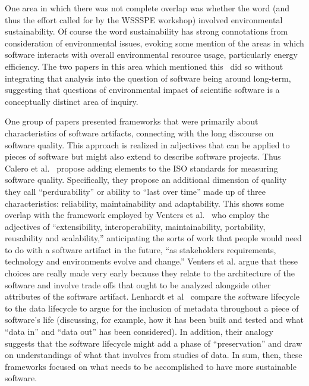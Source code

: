 \documentclass[11pt, oneside]{amsart}
\begin{document}
One area in which there was not complete overlap was whether the word
(and thus the effort called for by the WSSSPE workshop) involved
environmental sustainability. Of course the word sustainability has
strong connotations from consideration of environmental issues,
evoking some mention of the areas in which software interacts with
overall environmental resource usage, particularly energy efficiency.
The two papers in this area which mentioned this~\cite{Venters_WSSSPE,Calero_WSSSPE} did so without
integrating that analysis into the question of software being around
long-term, suggesting that questions of environmental impact of
scientific software is a conceptually distinct area of inquiry.

One group of papers presented frameworks that were primarily about
characteristics of software artifacts, connecting with the long
discourse on software quality. This approach is realized in adjectives
that can be applied to pieces of software but might also extend to
describe software projects.  Thus Calero et al.~\cite{Calero_WSSSPE} propose adding elements to the ISO
standards for measuring software quality. Specifically, they propose an additional
dimension of quality they call ``perdurability'' or ability to ``last over
time'' made up of three characteristics: reliability, maintainability
and adaptability. This shows some overlap with the framework employed
by Venters et al.~\cite{Venters_WSSSPE} who employ the adjectives of
``extensibility, interoperability, maintainability, portability,
reusability and scalability,'' anticipating the sorts of work that
people would need to do with a software artifact in the future, ``as
stakeholders requirements, technology and environments evolve and
change.'' Venters et al. argue that these choices are really made very
early because they relate to the architecture of the software and
involve trade offs that ought to be analyzed alongside other
attributes of the software artifact. Lenhardt et
al~\cite{Lenhardt_WSSSPE} compare the software lifecycle to the data
lifecycle to argue for the inclusion of metadata throughout a piece of
software's life (discussing, for example, how it has been built and
tested and what ``data in'' and ``data out'' has been considered). In
addition, their analogy suggests that the software lifecycle might add
a phase of ``preservation'' and draw on understandings of what that
involves from studies of data.  In sum, then, these frameworks focused
on what needs to be accomplished to have more sustainable software.
\end{document}
